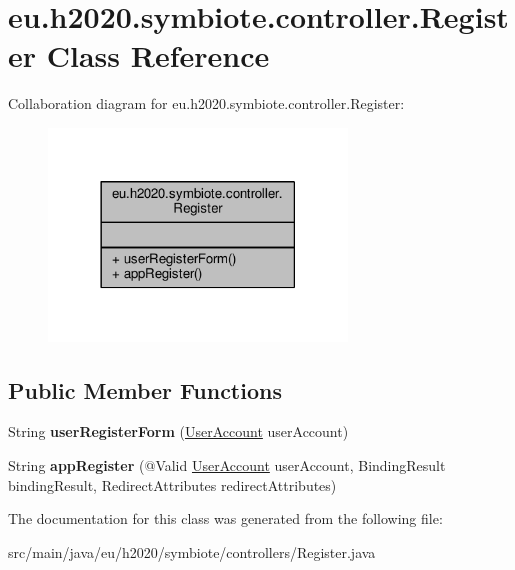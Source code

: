 \hypertarget{classeu_1_1h2020_1_1symbiote_1_1controller_1_1Register}{}\section{eu.\+h2020.\+symbiote.\+controller.\+Register Class Reference}
\label{classeu_1_1h2020_1_1symbiote_1_1controller_1_1Register}


Collaboration diagram for eu.\+h2020.\+symbiote.\+controller.\+Register\+:
\nopagebreak
\begin{figure}[H]
\begin{center}
\leavevmode
\includegraphics[width=225pt]{classeu_1_1h2020_1_1symbiote_1_1controller_1_1Register__coll__graph}
\end{center}
\end{figure}
\subsection*{Public Member Functions}
\begin{DoxyCompactItemize}
\item 
String {\bfseries user\+Register\+Form} (\hyperlink{classeu_1_1h2020_1_1symbiote_1_1model_1_1UserAccount}{User\+Account} user\+Account)\hypertarget{classeu_1_1h2020_1_1symbiote_1_1controller_1_1Register_ab996734e6e02738a0f8ee7d813c2f7cf}{}\label{classeu_1_1h2020_1_1symbiote_1_1controller_1_1Register_ab996734e6e02738a0f8ee7d813c2f7cf}

\item 
String {\bfseries app\+Register} (@Valid \hyperlink{classeu_1_1h2020_1_1symbiote_1_1model_1_1UserAccount}{User\+Account} user\+Account, Binding\+Result binding\+Result, Redirect\+Attributes redirect\+Attributes)\hypertarget{classeu_1_1h2020_1_1symbiote_1_1controller_1_1Register_af2365a11b5af23ed0c6aa32b29eb69eb}{}\label{classeu_1_1h2020_1_1symbiote_1_1controller_1_1Register_af2365a11b5af23ed0c6aa32b29eb69eb}

\end{DoxyCompactItemize}


The documentation for this class was generated from the following file\+:\begin{DoxyCompactItemize}
\item 
src/main/java/eu/h2020/symbiote/controllers/Register.\+java\end{DoxyCompactItemize}

